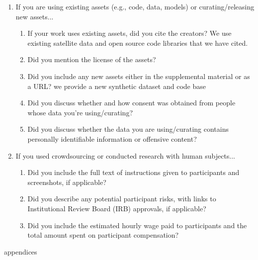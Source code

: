 \documentclass{article}
\begin{document}
\begin{enumerate}
\item If you are using existing assets (e.g., code, data, models) or curating/releasing new assets...
\begin{enumerate}
  \item If your work uses existing assets, did you cite the creators?
    \answerYes{} We use existing satellite data and open source code libraries that we have cited. 
  \item Did you mention the license of the assets?
    \answerYes{}
  \item Did you include any new assets either in the supplemental material or as a URL?
    \answerYes{} we provide a new synthetic dataset and code base
  \item Did you discuss whether and how consent was obtained from people whose data you're using/curating?
    \answerNA{}
  \item Did you discuss whether the data you are using/curating contains personally identifiable information or offensive content?
    \answerNA{}
\end{enumerate}


\item If you used crowdsourcing or conducted research with human subjects...
\begin{enumerate}
  \item Did you include the full text of instructions given to participants and screenshots, if applicable?
    \answerNA{}
  \item Did you describe any potential participant risks, with links to Institutional Review Board (IRB) approvals, if applicable?
    \answerNA{}
  \item Did you include the estimated hourly wage paid to participants and the total amount spent on participant compensation?
    \answerNA{}
\end{enumerate}


\end{enumerate}



{appendices}
\end{document}
